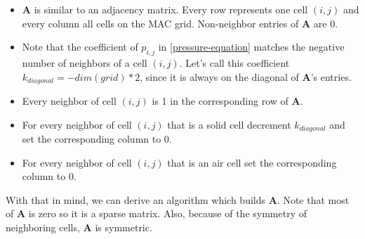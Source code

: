 \begin{itemize}
      \item $\mathbf{A}$ is similar to an adjacency matrix. Every row represents one cell $(i,j)$ and every column all cells on the MAC grid. Non-neighbor entries of $\mathbf{A}$ are 0.
      \item Note that the coefficient of $p_{i,j}$ in \ref{pressure-equation} matches the negative number of neighbors of a cell $(i,j)$. Let's call this coefficient $k_{diagonal} = -dim(grid) * 2$, since it is always on the diagonal of $\mathbf{A}$'s entries.
      \item Every neighbor of cell $(i,j)$ is 1 in the corresponding row of $\mathbf{A}$.
      \item For every neighbor of cell $(i,j)$ that is a solid cell decrement $k_{diagonal}$ and set the corresponding column to 0.
      \item For every neighbor of cell $(i,j)$ that is an air cell set the corresponding column to 0.
\end{itemize}
With that in mind, we can derive an algorithm which builds $\mathbf{A}$. Note that most of $\mathbf{A}$ is zero so it is a sparse matrix. Also, because of the symmetry of neighboring cells, $\mathbf{A}$ is symmetric.
